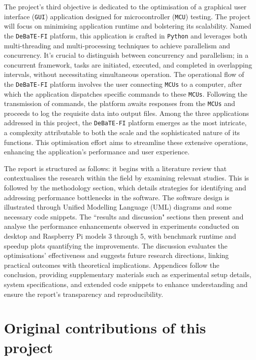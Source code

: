 \documentclass[12pt, openany]{book}
\begin{document}
The project's third objective is dedicated to the optimisation of a graphical user interface (\texttt{GUI}) application designed for microcontroller (\texttt{MCU}) testing. The project will focus on minimising application runtime and bolstering its scalability. Named the \texttt{DeBaTE-FI} platform\cite{debate_fi_publication}, this application is crafted in \texttt{Python} and leverages both multi-threading and multi-processing techniques to achieve parallelism and concurrency. It's crucial to distinguish between concurrency and parallelism; in a concurrent framework, tasks are initiated, executed, and completed in overlapping intervals, without necessitating simultaneous operation. The operational flow of the \texttt{DeBaTE-FI} platform involves the user connecting \texttt{MCUs} to a computer, after which the application dispatches specific commands to these \texttt{MCUs}. Following the transmission of commands, the platform awaits responses from the \texttt{MCUs} and proceeds to log the requisite data into output files. Among the three applications addressed in this project, the \texttt{DeBaTE-FI} platform emerges as the most intricate, a complexity attributable to both the scale and the sophisticated nature of its functions. This optimisation effort aims to streamline these extensive operations, enhancing the application's performance and user experience.

The report is structured as follows: it begins with a literature review that contextualises the research within the field by examining relevant studies. This is followed by the methodology section, which details strategies for identifying and addressing performance bottlenecks in the software. The software design is illustrated through Unified Modelling Language (UML) diagrams and some necessary code snippets. The ``results and discussion" sections then present and analyse the performance enhancements observed in experiments conducted on desktop and Raspberry Pi models 3 through 5, with benchmark runtime and speedup plots quantifying the improvements. The discussion evaluates the optimisations' effectiveness and suggests future research directions, linking practical outcomes with theoretical implications. Appendices follow the conclusion, providing supplementary materials such as experimental setup details, system specifications, and extended code snippets to enhance understanding and ensure the report's transparency and reproducibility.

\newpage
\section{Original contributions of this project}
\end{document}
